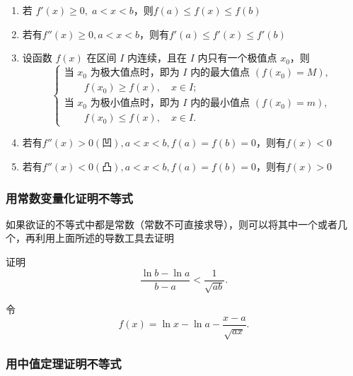 \documentclass[../book.tex]{subfiles}
\begin{document}
    \begin{enumerate}
        \item 若 $f'(x)\ge 0,\; a<x<b$，则$f(a)\leq f(x)\leq f(b)$
        \item 若有$f''(x) \geq 0, a < x < b$，则有$f'(a) \leq f'(x) \leq f'(b)$
        \item 设函数 $f(x)$ 在区间 $I$ 内连续，且在 $I$ 内只有一个极值点 $x_0$，则
        \[
            \begin{cases}
                \text{当 } x_0 \text{ 为极大值点时，即为 } I \text{ 内的最大值点 } (f(x_0)=M), \\
                \qquad f(x_0)\ge f(x), \quad x\in I; \\[6pt]
                \text{当 } x_0 \text{ 为极小值点时，即为 } I \text{ 内的最小值点 } (f(x_0)=m), \\
                \qquad f(x_0)\le f(x), \quad x\in I.
            \end{cases}
        \]
        \item 若有$f''(x) > 0(\text{凹}), a < x < b, f(a) = f(b) = 0$，则有$f(x) < 0$
        \item 若有$f''(x) < 0(\text{凸}), a < x < b, f(a) = f(b) = 0$，则有$f(x) > 0$
    \end{enumerate}

    \subsubsection{用常数变量化证明不等式}

    如果欲证的不等式中都是常数（常数不可直接求导），则可以将其中一个或者几个{\color{red}{常数变量化}}，再利用上面所述的导数工具去证明

    \begin{analysisbox}[Example]
        证明
        \[
            \frac{\ln b - \ln a}{\,b - a\,}
            <
            \frac{1}{\sqrt{ab}}.
        \]

        令
        \[
            f(x)
            = \ln x - \ln a - \frac{x-a}{\sqrt{ax}}.
        \]
    \end{analysisbox}

    \subsubsection{用中值定理证明不等式}
\end{document}
